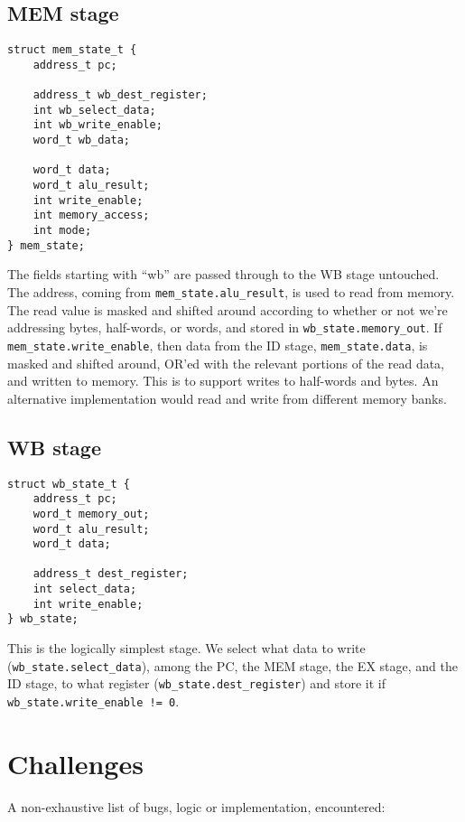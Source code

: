 \documentclass[]{IEEEtran}
\begin{document}
\subsection{MEM stage}

\begin{verbatim}
struct mem_state_t {
    address_t pc;

    address_t wb_dest_register;
    int wb_select_data;
    int wb_write_enable;
    word_t wb_data;

    word_t data;
    word_t alu_result;
    int write_enable;
    int memory_access;
    int mode;
} mem_state;
\end{verbatim}

The fields starting with ``wb'' are passed through to the WB stage untouched.
The address, coming from \verb|mem_state.alu_result|, is used to read from
memory. The read value is masked and shifted around according to whether or not
we're addressing bytes, half-words, or words, and stored in
\verb|wb_state.memory_out|. If \verb|mem_state.write_enable|, then data from the
ID stage, \verb|mem_state.data|, is masked and shifted around, OR'ed with the
relevant portions of the read data, and written to memory. This is to support
writes to half-words and bytes. An alternative implementation would read and
write from different memory banks.


\subsection{WB stage}

\begin{verbatim}
struct wb_state_t {
    address_t pc;
    word_t memory_out;
    word_t alu_result;
    word_t data;

    address_t dest_register;
    int select_data;
    int write_enable;
} wb_state;
\end{verbatim}

This is the logically simplest stage. We select what data to write
(\verb|wb_state.select_data|), among the PC, the MEM stage, the EX stage, and
the ID stage, to what register (\verb|wb_state.dest_register|) and store it if
\verb|wb_state.write_enable != 0|.


\section{Challenges}

A non-exhaustive list of bugs, logic or implementation, encountered:
\end{document}
